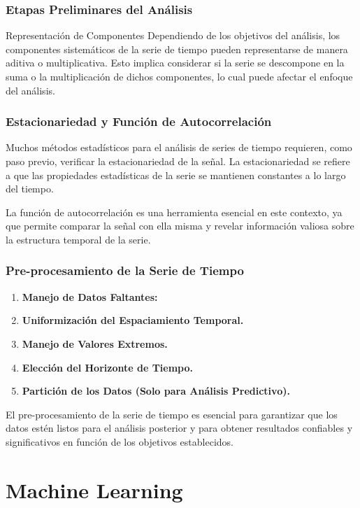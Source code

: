 \documentclass{beamer}
\begin{document}
  \begin{frame}
	\frametitle{Etapas Preliminares del Análisis}
	\begin{block}{Representación de Componentes}
		Dependiendo de los objetivos del análisis, los componentes sistemáticos de la serie de tiempo pueden representarse de manera aditiva o multiplicativa. Esto implica considerar si la serie se descompone en la suma o la multiplicación de dichos componentes, lo cual puede afectar el enfoque del análisis.
	\end{block}
  \end{frame}
  
  \begin{frame}
	\frametitle{Estacionariedad y Función de Autocorrelación}
	Muchos métodos estadísticos para el análisis de series de tiempo requieren, como paso previo, verificar la estacionariedad de la señal. La estacionariedad se refiere a que las propiedades estadísticas de la serie se mantienen constantes a lo largo del tiempo.
	
	La función de autocorrelación es una herramienta esencial en este contexto, ya que permite comparar la señal con ella misma y revelar información valiosa sobre la estructura temporal de la serie.
  \end{frame}
  
  \begin{frame}
	\frametitle{Pre-procesamiento de la Serie de Tiempo}
	\begin{enumerate}
	  \item \textbf{Manejo de Datos Faltantes:} 
	  \item \textbf{Uniformización del Espaciamiento Temporal.}
	  \item \textbf{Manejo de Valores Extremos.}
	  \item \textbf{Elección del Horizonte de Tiempo.}
	  \item \textbf{Partición de los Datos (Solo para Análisis Predictivo).}
	\end{enumerate}
	El pre-procesamiento de la serie de tiempo es esencial para garantizar que los datos estén listos para el análisis posterior y para obtener resultados confiables y significativos en función de los objetivos establecidos.
  \end{frame}
  


\section{Machine Learning}
	
\end{document}

